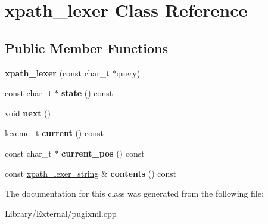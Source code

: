 \hypertarget{classxpath__lexer}{}\section{xpath\+\_\+lexer Class Reference}
\label{classxpath__lexer}
\subsection*{Public Member Functions}
\begin{DoxyCompactItemize}
\item 
\hypertarget{classxpath__lexer_aa52661c9ba7dfa262d3ab49f578653c3}{}{\bfseries xpath\+\_\+lexer} (const char\+\_\+t $\ast$query)\label{classxpath__lexer_aa52661c9ba7dfa262d3ab49f578653c3}

\item 
\hypertarget{classxpath__lexer_a3794e29f3bec2fa31346766eea978cbf}{}const char\+\_\+t $\ast$ {\bfseries state} () const \label{classxpath__lexer_a3794e29f3bec2fa31346766eea978cbf}

\item 
\hypertarget{classxpath__lexer_a32684b3097fccb4d626da620b44b72ad}{}void {\bfseries next} ()\label{classxpath__lexer_a32684b3097fccb4d626da620b44b72ad}

\item 
\hypertarget{classxpath__lexer_a06cdc258948ef3a1a69bd7d5733fd987}{}lexeme\+\_\+t {\bfseries current} () const \label{classxpath__lexer_a06cdc258948ef3a1a69bd7d5733fd987}

\item 
\hypertarget{classxpath__lexer_a7adef722d64938e3ba79ae1a7e1c0d71}{}const char\+\_\+t $\ast$ {\bfseries current\+\_\+pos} () const \label{classxpath__lexer_a7adef722d64938e3ba79ae1a7e1c0d71}

\item 
\hypertarget{classxpath__lexer_aebb02b6d507f5e0839bfa42116bdbc9c}{}const \hyperlink{structxpath__lexer__string}{xpath\+\_\+lexer\+\_\+string} \& {\bfseries contents} () const \label{classxpath__lexer_aebb02b6d507f5e0839bfa42116bdbc9c}

\end{DoxyCompactItemize}


The documentation for this class was generated from the following file\+:\begin{DoxyCompactItemize}
\item 
Library/\+External/pugixml.\+cpp\end{DoxyCompactItemize}
